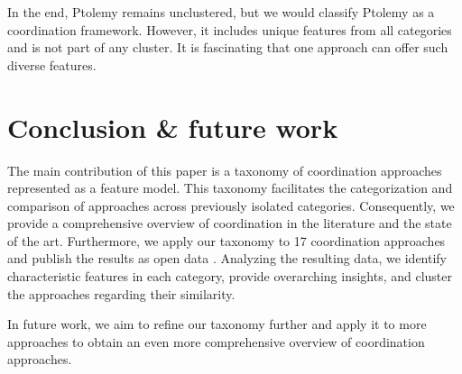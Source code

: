 \documentclass[runningheads]{llncs}
\begin{document}
In the end, Ptolemy remains unclustered, but we would classify Ptolemy as a coordination framework.
However, it includes unique features from all categories and is not part of any cluster.
It is fascinating that one approach can offer such diverse features.


\section{Conclusion \& future work} \label{sec: conclusion}

The main contribution of this paper is a taxonomy of coordination approaches represented as a feature model.
This taxonomy facilitates the categorization and comparison of approaches across previously isolated categories.
Consequently, we provide a comprehensive overview of coordination in the literature and the state of the art.
Furthermore, we apply our taxonomy to 17 coordination approaches and publish the results as open data \cite{timkrauterArtifactsCoordination2024}.
Analyzing the resulting data, we identify characteristic features in each category, provide overarching insights, and cluster the approaches regarding their similarity. 

In future work, we aim to refine our taxonomy further and apply it to more approaches to obtain an even more comprehensive overview of coordination approaches.



\end{document}
